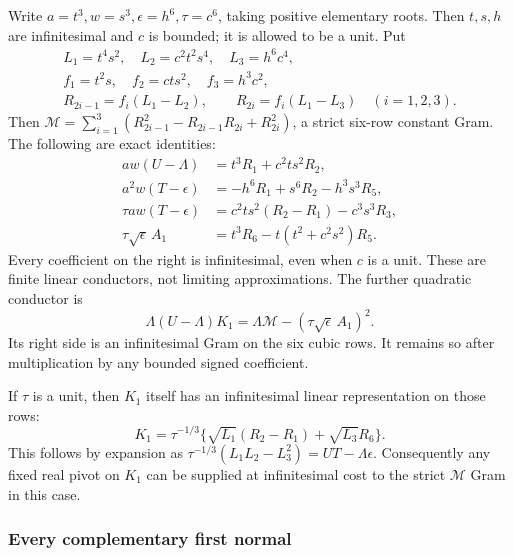 Write \(a=t^3,w=s^3,\epsilon=h^6,\tau=c^6\), taking positive
elementary roots. Then \(t,s,h\) are infinitesimal and \(c\)
is bounded; it is allowed to be a unit. Put
\[
\begin{gathered}
 L_1=t^4s^2,\quad L_2=c^2t^2s^4,\quad L_3=h^6c^4,\\
 f_1=t^2s,\quad f_2=cts^2,\quad f_3=h^3c^2,\\
 R_{2i-1}=f_i(L_1-L_2),\qquad R_{2i}=f_i(L_1-L_3)
 \quad (i=1,2,3).
\end{gathered}\tag{WN24}
\]
Then \(\mathcal M=\sum_{i=1}^3(R_{2i-1}^2-R_{2i-1}R_{2i}+R_{2i}^2)\),
a strict six-row constant Gram. The following are exact identities:
\[
\begin{aligned}
 aw(U-\Lambda)&=t^3R_1+c^2ts^2R_2,\\
 a^2w(T-\epsilon)&=-h^6R_1+s^6R_2-h^3s^3R_5,\\
 \tau aw(T-\epsilon)&=c^2ts^2(R_2-R_1)-c^3s^3R_3,\\
 \tau\sqrt\epsilon\,A_1&=t^3R_6-t(t^2+c^2s^2)R_5 .
\end{aligned}\tag{WN25}
\]
Every coefficient on the right is infinitesimal, even when \(c\)
is a unit. These are finite linear conductors, not limiting
approximations. The further quadratic conductor is
\[
 \boxed{\ \Lambda(U-\Lambda)K_1
       =\Lambda\mathcal M-(\tau\sqrt\epsilon\,A_1)^2.\ }
 \tag{WN26}
\]
Its right side is an infinitesimal Gram on the six cubic rows.
It remains so after multiplication by any bounded signed coefficient.

If \(\tau\) is a unit, then \(K_1\) itself has an infinitesimal
linear representation on those rows:
\[
 K_1=\tau^{-1/3}
       \{\sqrt{L_1}(R_2-R_1)+\sqrt{L_3}R_6\}.
 \tag{WN27}
\]
This follows by expansion as
\(\tau^{-1/3}(L_1L_2-L_3^2)=UT-\Lambda\epsilon\).
Consequently any fixed real pivot on \(K_1\) can be supplied at
infinitesimal cost to the strict \(\mathcal M\) Gram in this case.

\subsubsection*{Every complementary first normal}

